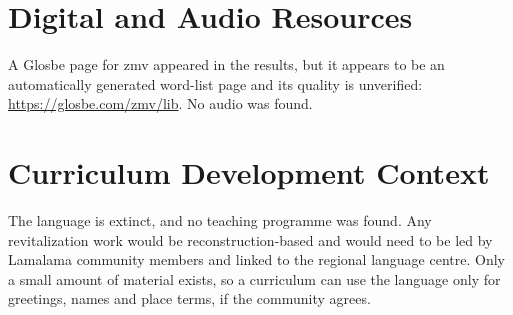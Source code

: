 \documentclass[12pt]{article}
\begin{document}
\section{Digital and Audio Resources}
A Glosbe page for zmv appeared in the results, but it appears to be an automatically generated word-list page and its quality is unverified: \url{https://glosbe.com/zmv/lib}. No audio was found.

\section{Curriculum Development Context}
The language is extinct, and no teaching programme was found. Any revitalization work would be reconstruction-based and would need to be led by Lamalama community members and linked to the regional language centre. Only a small amount of material exists, so a curriculum can use the language only for greetings, names and place terms, if the community agrees.
\end{document}
